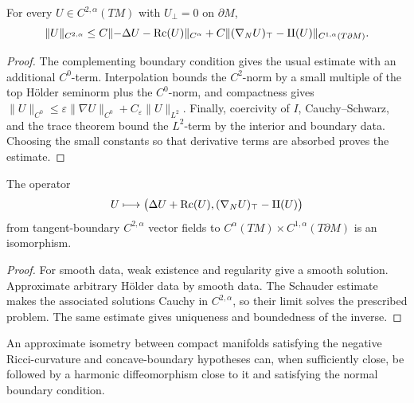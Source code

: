 \begin{lemma}
\label{lem:chow-iv-linearized-harmonic-boundary-schauder}

For every \(U\in C^{2,\alpha}(TM)\) with \(U_\perp=0\) on \(\partial M\),
\[
 \|U\|_{C^{2,\alpha}}
 \le C\|{-\Delta U-\operatorname{Rc}(U)}\|_{C^\alpha}
 +C\|(\nabla_NU)_{\top}-\mathrm{II}(U)\|_{C^{1,\alpha}(T\partial M)}.
\]
\end{lemma}
\begin{proof}
\sketch
The complementing boundary condition gives the usual estimate with an
additional \(C^0\)-term.  Interpolation bounds the \(C^2\)-norm by a small
multiple of the top Hölder seminorm plus the \(C^0\)-norm, and compactness gives
\(\|U\|_{C^0}\le\varepsilon\|\nabla U\|_{C^0}+C_\varepsilon\|U\|_{L^2}\).
Finally, coercivity of \(I\), Cauchy--Schwarz, and the trace theorem bound the
\(L^2\)-term by the interior and boundary data.  Choosing the small constants
so that derivative terms are absorbed proves the estimate.
\end{proof}

\begin{lemma}
\label{lem:chow-iv-linearized-harmonic-boundary-operator-invertible}


The operator
\[
 U\longmapsto
 \bigl(\Delta U+\operatorname{Rc}(U),(\nabla_NU)_{\top}-\mathrm{II}(U)\bigr)
\]
from tangent-boundary \(C^{2,\alpha}\) vector fields to
\(C^\alpha(TM)\times C^{1,\alpha}(T\partial M)\) is an isomorphism.
\end{lemma}
\begin{proof}
\sketch
For smooth data, weak existence and regularity give a smooth solution.  Approximate
arbitrary Hölder data by smooth data.  The Schauder estimate makes the associated
solutions Cauchy in \(C^{2,\alpha}\), so their limit solves the prescribed
problem.  The same estimate gives uniqueness and boundedness of the inverse.
\end{proof}

\begin{claim}
\label{clm:chow-iv-harmonic-diffeomorphism-near-approximate-isometry}


An approximate isometry between compact manifolds satisfying the negative
Ricci-curvature and concave-boundary hypotheses can, when sufficiently close,
be followed by a harmonic diffeomorphism close to it and satisfying the normal
boundary condition.
\end{claim}

